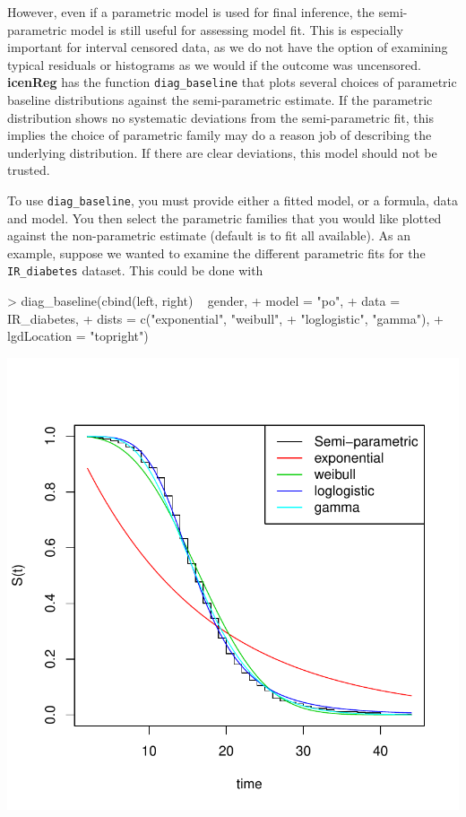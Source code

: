 \documentclass[a4paper]{article}
\begin{document}
  
However, even if a parametric model is used for final inference, the semi-parametric model is still useful for assessing model fit. This is especially important for interval censored data, as we do not have the option of examining typical residuals or histograms as we would if the outcome was uncensored. {\bf icenReg} has the function \texttt{diag\_baseline} that plots several choices of parametric baseline distributions against the semi-parametric estimate. If the parametric distribution shows no systematic deviations from the semi-parametric fit, this implies the choice of parametric family may do a reason job of describing the underlying distribution. If there are clear deviations, this model should not be trusted. 
  
To use \texttt{diag\_baseline}, you must provide either a fitted model, or a formula, data and model. You then select the parametric families that you would like plotted against the non-parametric estimate (default is to fit all available). As an example, suppose we wanted to examine the different parametric fits for the \texttt{IR\_diabetes} dataset. This could be done with 
  
\begin{Schunk}
\begin{Sinput}
> diag_baseline(cbind(left, right) ~ gender,
+     model = "po",
+     data = IR_diabetes,
+     dists = c("exponential", "weibull", 
+               "loglogistic", "gamma"),
+     lgdLocation = "topright")
\end{Sinput}
\end{Schunk}
\includegraphics{icenReg-013}
\end{document}
